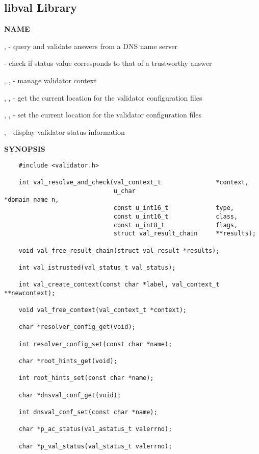 \clearpage

\subsection{\bf libval Library}

{\bf NAME}

,  - query
and validate answers from a DNS name server

 - check if status value corresponds to that of a
trustworthy answer

, ,
 - manage validator context

, ,
 - get the current location for the validator
configuration files

, ,
 - set the current location for the validator
configuration files

,  - display validator status
information

{\bf SYNOPSIS}

\begin{verbatim}
    #include <validator.h>

    int val_resolve_and_check(val_context_t               *context,
                              u_char                      *domain_name_n,
                              const u_int16_t             type,
                              const u_int16_t             class,
                              const u_int8_t              flags,
                              struct val_result_chain     **results);

    void val_free_result_chain(struct val_result *results);

    int val_istrusted(val_status_t val_status);

    int val_create_context(const char *label, val_context_t **newcontext);

    void val_free_context(val_context_t *context);

    char *resolver_config_get(void);

    int resolver_config_set(const char *name);

    char *root_hints_get(void);

    int root_hints_set(const char *name);

    char *dnsval_conf_get(void);

    int dnsval_conf_set(const char *name);

    char *p_ac_status(val_astatus_t valerrno);

    char *p_val_status(val_status_t valerrno);

\end{verbatim}

